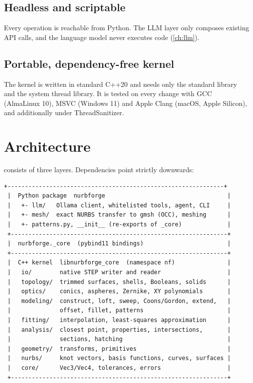 \subsection{Headless and scriptable}
Every operation is reachable from Python. The LLM layer only composes existing API calls, and
the language model never executes code (\cref{ch:llm}).

\subsection{Portable, dependency-free kernel}
The kernel is written in standard C++20 and needs only the standard library and the system
thread library. It is tested on every change with GCC (AlmaLinux 10), MSVC (Windows 11) and
Apple Clang (macOS, Apple Silicon), and additionally under ThreadSanitizer.

\section{Architecture}\label{sec:intro-architecture}

\NF{} consists of three layers. Dependencies point strictly downwards:

\begin{lstlisting}[style=text]
 +--------------------------------------------------------------+
 |  Python package  nurbforge                                   |
 |   +- llm/   Ollama client, whitelisted tools, agent, CLI     |
 |   +- mesh/  exact NURBS transfer to gmsh (OCC), meshing      |
 |   +- patterns.py, __init__ (re-exports of _core)             |
 +--------------------------------------------------------------+
 |  nurbforge._core  (pybind11 bindings)                        |
 +--------------------------------------------------------------+
 |  C++ kernel  libnurbforge_core  (namespace nf)               |
 |   io/        native STEP writer and reader                   |
 |   topology/  trimmed surfaces, shells, Booleans, solids      |
 |   optics/    conics, aspheres, Zernike, XY polynomials       |
 |   modeling/  construct, loft, sweep, Coons/Gordon, extend,   |
 |              offset, fillet, patterns                        |
 |   fitting/   interpolation, least-squares approximation      |
 |   analysis/  closest point, properties, intersections,       |
 |              sections, hatching                              |
 |   geometry/  transforms, primitives                          |
 |   nurbs/     knot vectors, basis functions, curves, surfaces |
 |   core/      Vec3/Vec4, tolerances, errors                   |
 +--------------------------------------------------------------+
\end{lstlisting}

